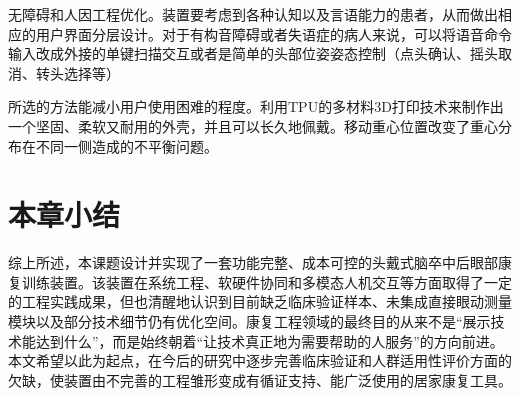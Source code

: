 无障碍和人因工程优化。装置要考虑到各种认知以及言语能力的患者，从而做出相应的用户界面分层设计。对于有构音障碍或者失语症的病人来说，可以将语音命令输入改成外接的单键扫描交互或者是简单的头部位姿姿态控制（点头确认、摇头取消、转头选择等）

所选的方法能减小用户使用困难的程度。利用TPU的多材料3D打印技术来制作出一个坚固、柔软又耐用的外壳，并且可以长久地佩戴。移动重心位置改变了重心分布在不同一侧造成的不平衡问题。


\section{本章小结}

综上所述，本课题设计并实现了一套功能完整、成本可控的头戴式脑卒中后眼部康复训练装置。该装置在系统工程、软硬件协同和多模态人机交互等方面取得了一定的工程实践成果，但也清醒地认识到目前缺乏临床验证样本、未集成直接眼动测量模块以及部分技术细节仍有优化空间。康复工程领域的最终目的从来不是“展示技术能达到什么”，而是始终朝着“让技术真正地为需要帮助的人服务”的方向前进。本文希望以此为起点，在今后的研究中逐步完善临床验证和人群适用性评价方面的欠缺，使装置由不完善的工程雏形变成有循证支持、能广泛使用的居家康复工具。
